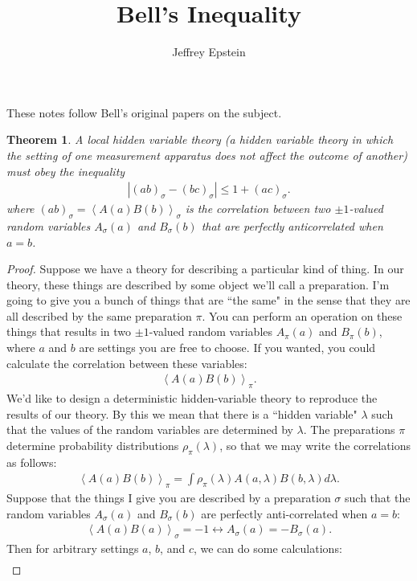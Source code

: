 \documentclass[]{article}
\title{Bell's Inequality}
\author{Jeffrey Epstein}
\newcommand{\brak}[1]{\left\langle#1\right\rangle}
\newcommand{\modulus}[1]{\left\vert#1\right\vert}
\theoremstyle{plain}
\newtheorem{theorem}{Theorem}
\theoremstyle{definition}
\theoremstyle{remark}
\begin{document}
\maketitle
\noindent These notes follow Bell's original papers on the subject.
\begin{theorem}
A local hidden variable theory (a hidden variable theory in which the setting of one measurement apparatus does not affect the outcome of another) must obey the inequality
\begin{align}
\modulus{(ab)_\sigma-(bc)_\sigma}\leq 1+(ac)_\sigma.
\end{align}
where $(ab)_\sigma=\brak{A(a)B(b)}_\sigma$ is the correlation between two $\pm 1$-valued random variables $A_\sigma(a)$ and $B_\sigma(b)$ that are perfectly anticorrelated when $a=b$. 
\end{theorem}
\begin{proof}
Suppose we have a theory for describing a particular kind of thing. In our theory, these things are described by some object we'll call a preparation. I'm going to give you a bunch of things that are ``the same" in the sense that they are all described by the same preparation $\pi$. You can perform an operation on these things that results in two $\pm 1$-valued random variables $A_\pi(a)$ and $B_\pi(b)$, where $a$ and $b$ are settings you are free to choose. If you wanted, you could calculate the correlation between these variables:
\begin{align}
\brak{A(a)B(b)}_\pi.
\end{align}
We'd like to design a deterministic hidden-variable theory to reproduce the results of our theory. By this we mean that there is a ``hidden variable" $\lambda$ such that the values of the random variables are determined by $\lambda$. The preparations $\pi$ determine probability distributions $\rho_\pi(\lambda)$, so that we may write the correlations as follows:
\begin{align}
\brak{A(a)B(b)}_\pi=\int \rho_\pi(\lambda)A(a,\lambda)B(b,\lambda)d\lambda.
\end{align}
Suppose that the things I give you are described by a preparation $\sigma$ such that the random variables $A_\sigma(a)$ and $B_\sigma(b)$ are perfectly anti-correlated when $a=b$:
\begin{align}
\brak{A(a)B(a)}_\sigma=-1\longleftrightarrow A_\sigma(a)=-B_\sigma(a).
\end{align}
Then for arbitrary settings $a$, $b$, and $c$, we can do some calculations:
\begin{align}

\end{align}
\end{proof}
\end{document}
